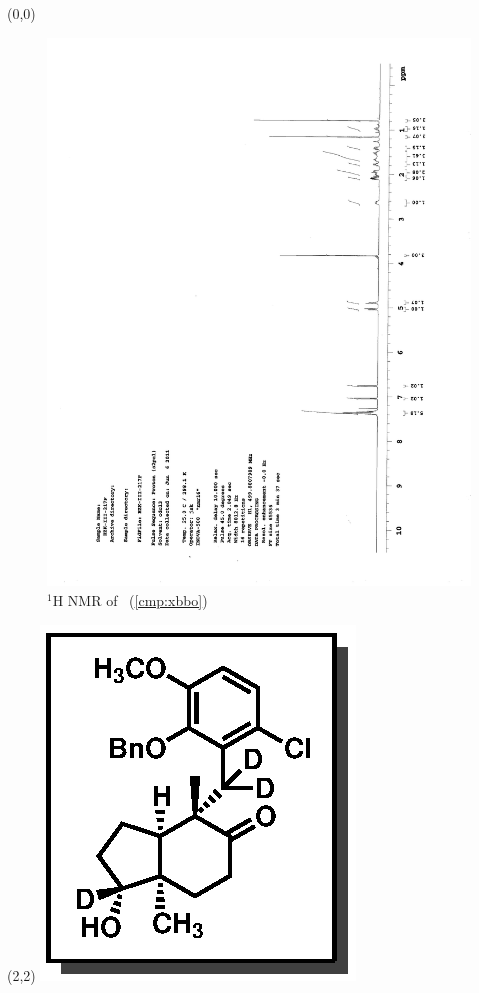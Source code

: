 \begin{textblock}{20}(0,0)
\begin{figure}[htb]
\caption{$^1$H NMR of \CMPxbbo\ (\ref{cmp:xbbo})}
\includegraphics[scale=0.75, trim = 0mm 0mm 0mm 5mm,
clip]{chp_singlecarbon/images/nmr/xbboH}
\vspace{-100pt}
\end{figure}
\end{textblock}
\begin{textblock}{1}(2,2)
\includegraphics[scale=0.8, angle=90]{chp_singlecarbon/images/xbbo}
\end{textblock}
